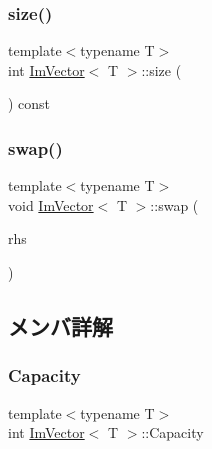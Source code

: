 \mbox{\label{class_im_vector_a8c903ecb1aaee0601b6a8ad835a4a435}} 
\subsubsection{\texorpdfstring{size()}{size()}}
{\footnotesize\ttfamily template$<$typename T$>$ \\
int \mbox{\hyperlink{class_im_vector}{Im\+Vector}}$<$ T $>$\+::size (\begin{DoxyParamCaption}{ }\end{DoxyParamCaption}) const\hspace{0.3cm}{\ttfamily [inline]}}

\mbox{\label{class_im_vector_afcec0d2a1e28aebe412b6efd06f0a77a}} 
\subsubsection{\texorpdfstring{swap()}{swap()}}
{\footnotesize\ttfamily template$<$typename T$>$ \\
void \mbox{\hyperlink{class_im_vector}{Im\+Vector}}$<$ T $>$\+::swap (\begin{DoxyParamCaption}\item[{\mbox{\hyperlink{class_im_vector}{Im\+Vector}}$<$ T $>$ \&}]{rhs }\end{DoxyParamCaption})\hspace{0.3cm}{\ttfamily [inline]}}



\subsection{メンバ詳解}
\mbox{\label{class_im_vector_abd24482b4d30d22e37582e521e5bfb33}} 
\subsubsection{\texorpdfstring{Capacity}{Capacity}}
{\footnotesize\ttfamily template$<$typename T$>$ \\
int \mbox{\hyperlink{class_im_vector}{Im\+Vector}}$<$ T $>$\+::Capacity}

